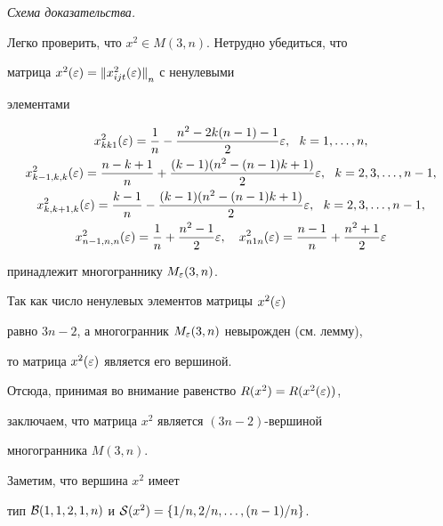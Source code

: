{\it Схема доказательства.}


Легко проверить, что $x^2\in M(3,n)$. Нетрудно убедиться, что


матрица $x^2(\varepsilon)={\|x^2_{ijt}(\varepsilon)\|}_n$ с ненулевыми


элементами


\begin{gather*}


x^2_{kk1}(\eps)=\frac{1}n-\frac{n^2-2k(n-1)-1}2\eps,\ \ k=1,\dotsc,n, \\


%


x^2_{k-1,k,k}(\eps)=\frac{n-k+1}n+


\frac{(k-1)(n^2-(n-1)k+1)}2\eps,\ \ k=2,3,\dotsc,n-1, \\


%


x^2_{k,k+1,k}(\eps)=\frac{k-1}n-


\frac{(k-1)(n^2-(n-1)k+1)}2\eps,\ \ k=2,3,\dotsc,n-1, \\


%


x^2_{n-1,n,n}(\eps)=\frac{1}n+


\frac{n^2-1}2\eps,\quad x^2_{n1n}(\eps)=\frac{n-1}n


+\frac{n^2+1}2\eps


\end{gather*}


принадлежит многограннику $M_\varepsilon (3,n)$. 


Так как число ненулевых элементов матрицы $x^2(\varepsilon)$ 


равно $3n-2$, а многогранник $M_\varepsilon (3,n)$ невырожден (см. лемму),


то матрица $x^2(\varepsilon)$ является его вершиной. 


Отсюда, принимая во внимание равенство $R(x^2)=R(x^2(\varepsilon))$, 


заключаем, что матрица $x^2$ является $(3n-2)$-вершиной


многогранника $M(3,n)$.





Заметим, что вершина $x^2$ имеет 


тип ${\cal B}(1,1,2,1,n)$ и ${\cal S}(x^2)=\{1/n,


2/n,\dotsc,(n-1)/n\}$.





